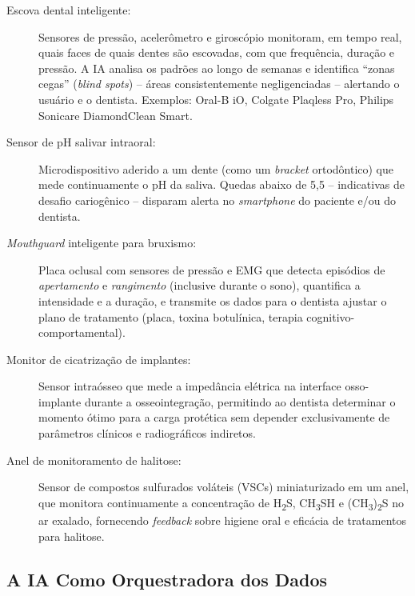 \begin{description}
  \item[Escova dental inteligente:] Sensores de pressão, acelerômetro e
    giroscópio monitoram, em tempo real, quais faces de quais dentes são
    escovadas, com que frequência, duração e pressão. A IA analisa os padrões
    ao longo de semanas e identifica ``zonas cegas'' (\textit{blind spots})
    -- áreas consistentemente negligenciadas -- alertando o usuário e o
    dentista. Exemplos: Oral-B iO, Colgate Plaqless Pro, Philips Sonicare
    DiamondClean Smart.

  \item[Sensor de pH salivar intraoral:] Microdispositivo aderido a um dente
    (como um \textit{bracket} ortodôntico) que mede continuamente o pH da
    saliva. Quedas abaixo de 5,5 -- indicativas de desafio cariogênico --
    disparam alerta no \textit{smartphone} do paciente e/ou do dentista.

  \item[\textit{Mouthguard} inteligente para bruxismo:] Placa oclusal com
    sensores de pressão e EMG que detecta episódios de \textit{apertamento}
    e \textit{rangimento} (inclusive durante o sono), quantifica a intensidade
    e a duração, e transmite os dados para o dentista ajustar o plano de
    tratamento (placa, toxina botulínica, terapia cognitivo-comportamental).

  \item[Monitor de cicatrização de implantes:] Sensor intraósseo que mede a
    impedância elétrica na interface osso-implante durante a osseointegração,
    permitindo ao dentista determinar o momento ótimo para a carga protética
    sem depender exclusivamente de parâmetros clínicos e radiográficos
    indiretos.

  \item[Anel de monitoramento de halitose:] Sensor de compostos sulfurados
    voláteis (VSCs) miniaturizado em um anel, que monitora continuamente a
    concentração de H\textsubscript{2}S, CH\textsubscript{3}SH e
    (CH\textsubscript{3})\textsubscript{2}S no ar exalado, fornecendo
    \textit{feedback} sobre higiene oral e eficácia de tratamentos para
    halitose.
\end{description}

\subsection{A IA Como Orquestradora dos Dados}

